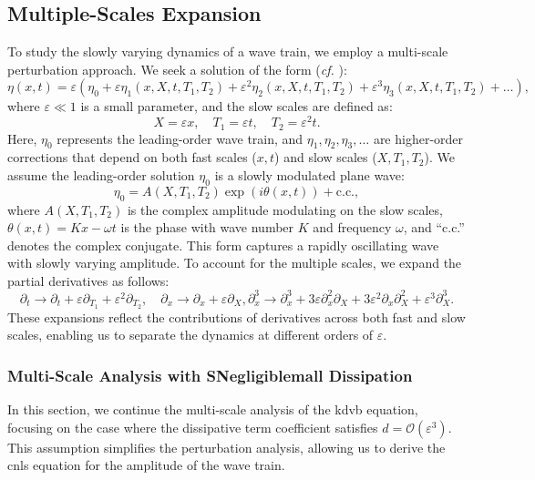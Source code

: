 \documentclass[alpha-refs, 12pt]{wiley-article}
\renewcommand{\O}{\mathcal{O}}
\newcommand{\eps}{\varepsilon}
\begin{document}
\subsection*{Multiple-Scales Expansion}

To study the slowly varying dynamics of a wave train, we employ a multi-scale perturbation approach. We seek a solution of the form (\emph{cf.} \cite{Dias2005}):
\begin{equation}
  \label{eq:ansatz}
  \eta(x,t) = \eps \left( \eta_0 + \eps \eta_1(x, X, t, T_1, T_2) + \eps^2 \eta_2(x, X, t, T_1, T_2) + \eps^3 \eta_3(x, X, t, T_1, T_2) + \dots \right),
\end{equation}
where $\eps \ll 1$ is a small parameter, and the slow scales are defined as:
\[
  X = \eps x, \quad T_1 = \eps t, \quad T_2 = \eps^2 t.
\]
Here, $\eta_0$ represents the leading-order wave train, and $\eta_1, \eta_2, \eta_3, \dots$ are higher-order corrections that depend on both fast scales ($x, t$) and slow scales ($X, T_1, T_2$). We assume the leading-order solution $\eta_0$ is a slowly modulated plane wave:
\begin{equation}\label{eq:wave_train}
  \eta_0 = A(X, T_1, T_2) \exp(i \theta(x, t)) + \text{c.c.},
\end{equation}
where $A(X, T_1, T_2)$ is the complex amplitude modulating on the slow scales, $\theta(x, t) = K x - \omega t$ is the phase with wave number $K$ and frequency $\omega$, and ``c.c.'' denotes the complex conjugate. This form captures a rapidly oscillating wave with slowly varying amplitude. To account for the multiple scales, we expand the partial derivatives as follows:
\begin{equation*}\label{eq:derivative_expansion}
  \partial_t \rightarrow \partial_t + \eps \partial_{T_1} + \eps^2 \partial_{T_2}, \quad \partial_x \rightarrow \partial_x + \eps \partial_X, \partial_x^3 \rightarrow \partial_x^3 + 3 \eps \partial_x^2 \partial_X + 3 \eps^2 \partial_x \partial_X^2 + \eps^3 \partial_X^3.
\end{equation*}
These expansions reflect the contributions of derivatives across both fast and slow scales, enabling us to separate the dynamics at different orders of $\eps$.

\subsubsection{Multi-Scale Analysis with SNegligiblemall Dissipation}

In this section, we continue the multi-scale analysis of the \acrshort{kdvb} equation, focusing on the case where the dissipative term coefficient satisfies $d = \O(\eps^3)$. This assumption simplifies the perturbation analysis, allowing us to derive the \acrfull{cnls} equation for the amplitude of the wave train.
\end{document}
